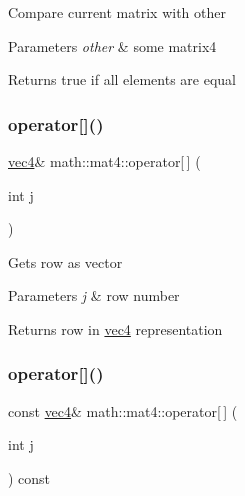 Compare current matrix with other 
\begin{DoxyParams}{Parameters}
{\em other} & some matrix4 \\
\hline
\end{DoxyParams}
\begin{DoxyReturn}{Returns}
true if all elements are equal 
\end{DoxyReturn}
\mbox{\label{structmath_1_1mat4_af1174463f36d030f31ba088c510e86d5}} 
\subsubsection{\texorpdfstring{operator[]()}{operator[]()}\hspace{0.1cm}{\footnotesize\ttfamily [1/2]}}
{\footnotesize\ttfamily \hyperlink{structmath_1_1vec4}{vec4}\& math\+::mat4\+::operator\mbox{[}$\,$\mbox{]} (\begin{DoxyParamCaption}\item[{int}]{j }\end{DoxyParamCaption})\hspace{0.3cm}{\ttfamily [inline]}}

Gets row as vector 
\begin{DoxyParams}{Parameters}
{\em j} & row number \\
\hline
\end{DoxyParams}
\begin{DoxyReturn}{Returns}
row in \hyperlink{structmath_1_1vec4}{vec4} representation 
\end{DoxyReturn}
\mbox{\label{structmath_1_1mat4_a7206a569f87bd24ee5a851899cf8c5c8}} 
\subsubsection{\texorpdfstring{operator[]()}{operator[]()}\hspace{0.1cm}{\footnotesize\ttfamily [2/2]}}
{\footnotesize\ttfamily const \hyperlink{structmath_1_1vec4}{vec4}\& math\+::mat4\+::operator\mbox{[}$\,$\mbox{]} (\begin{DoxyParamCaption}\item[{int}]{j }\end{DoxyParamCaption}) const\hspace{0.3cm}{\ttfamily [inline]}}

